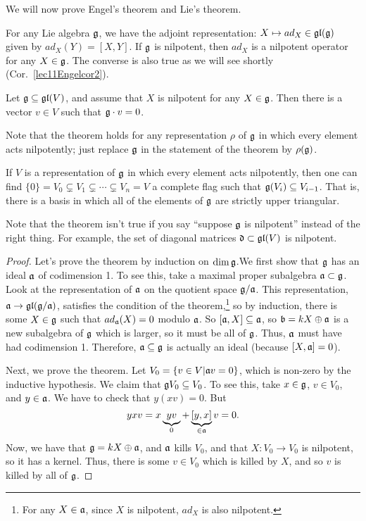  We will now prove Engel's theorem and Lie's theorem.


 For any Lie algebra $\mathfrak{g}$, we have  the adjoint representation: $X\mapsto ad_X\in
 \mathfrak{gl}(\mathfrak{g})$ given by $ad_X(Y)=[X,Y]$. If $\mathfrak{g}$ is nilpotent, then $ad_X$ is a nilpotent
 operator for any $X\in \mathfrak{g}$. The converse is also true as we will see shortly (Cor.\
 \ref{lec11Engelcor2}).

 \begin{theorem}[Engel's Theorem] \label{lec11Engel} 
   Let $\mathfrak{g}\subseteq \mathfrak{gl}(V)$, and assume that $X$ is nilpotent for any $X\in \mathfrak{g}$. Then
   there is a vector $v\in V$ such that $\mathfrak{g} \cdot v =0$.
 \end{theorem}
 Note that the theorem holds for any representation $\rho$ of $\mathfrak{g}$ in which every
 element acts nilpotently; just replace $\mathfrak{g}$ in the statement of the theorem by
 $\rho(\mathfrak{g})$.
 \begin{corollary}\label{lec11Engelcor}
   If $V$ is a representation of $\mathfrak{g}$ in which every element acts nilpotently, then
   one can find $\{0\}=V_0\subsetneq V_1\subsetneq \cdots \subsetneq V_n=V$ a complete
   flag such that $\mathfrak{g}(V_i)\subseteq V_{i-1}$. That is, there is a basis in which all
   of the elements of $\mathfrak{g}$ are strictly upper triangular.
 \end{corollary}
 \begin{warning}
 Note that the theorem isn't true if you say ``suppose $\mathfrak{g}$ is nilpotent'' instead of
 the right thing. For example, the set of diagonal matrices $\mathfrak{d}\subset
 \mathfrak{gl}(V)$ is nilpotent.
 \end{warning}
 \begin{proof}
  Let's prove the theorem by induction on $\dim \mathfrak{g}$.We first show that $\mathfrak{g}$ has an
  ideal $\mathfrak{a}$ of codimension 1. To see this, take a maximal proper subalgebra
  $\mathfrak{a}\subset \mathfrak{g}$. Look at the representation of $\mathfrak{a}$ on the quotient space $\mathfrak{g}/\mathfrak{a}$.
  This representation, $\mathfrak{a}\to \mathfrak{gl}(\mathfrak{g}/\mathfrak{a})$, satisfies the condition of the
  theorem,\footnote{For any $X\in \mathfrak{a}$, since $X$ is nilpotent, $ad_X$ is also
  nilpotent.} so by induction, there is some $X\in \mathfrak{g}$ such that $ad_{\mathfrak{a}}(X)=0$ modulo
  $\mathfrak{a}$. So $[\mathfrak{a},X]\subseteq \mathfrak{a}$, so $\mathfrak{b} = kX\oplus \mathfrak{a}$ is a new subalgebra of $\mathfrak{g}$
  which is larger, so it must be all of $\mathfrak{g}$. Thus, $\mathfrak{a}$ must have had codimension 1.
  Therefore, $\mathfrak{a}\subseteq \mathfrak{g}$ is actually an ideal (because $[X,\mathfrak{a}]=0$).

  Next, we prove the theorem. Let $V_0 = \{v\in V|\mathfrak{a}
  v=0\}$, which is non-zero by the inductive hypothesis. We claim that $\mathfrak{g}
  V_0\subseteq V_0$. To see this, take $x\in \mathfrak{g}$, $v\in V_0$, and $y\in \mathfrak{a}$. We have
  to check that $y(xv)=0$. But
  \[yxv = x\underbrace{yv}_0+\underbrace{[y,x]}_{\in \mathfrak{a}}v=0.\]
  Now, we have that $\mathfrak{g}=kX\oplus \mathfrak{a}$, and $\mathfrak{a}$ kills $V_0$, and that
  $X:V_0\to V_0$ is nilpotent, so it has a kernel. Thus, there is some $v\in
  V_0$ which is killed by $X$, and so $v$ is killed by all of $\mathfrak{g}$.
 \end{proof}
